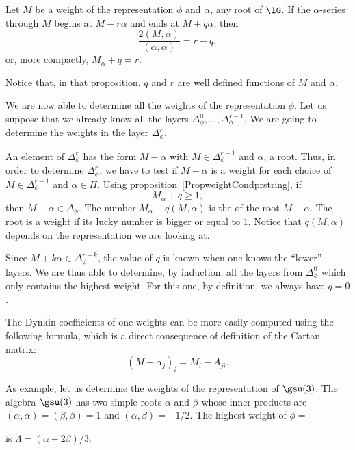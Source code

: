 \begin{proposition}     \label{PropweightCondprstring}
	Let $M$ be a weight of the representation $\phi$ and $\alpha$, any root of $\lG$. If the $\alpha$-series through $M$ begins at $M-r\alpha$ and ends at $M+q\alpha$, then
	\begin{equation}
		\frac{ 2(M,\alpha) }{ (\alpha,\alpha) }=r-q,
	\end{equation}
	or, more compactly, $M_{\alpha}+q=r$.
\end{proposition}
Notice that, in that proposition, $q$ and $r$ are well defined functions of $M$ and $\alpha$.

We are now able to determine all the weights of the representation $\phi$. Let us suppose that we already know all the layers $\Delta_{\phi}^0,\ldots,\Delta_{\phi}^{r-1}$. We are going to determine the weights in the layer $\Delta_{\phi}^r$.

An element of $\Delta_{\phi}^r$ has the form $M-\alpha$ with $M\in\Delta_{\phi}^{r-1}$ and $\alpha$, a root. Thus, in order to determine $\Delta_{\phi}^r$, we have to test if $M-\alpha$ is a weight for each choice of $M\in\Delta_{\phi}^{r-1}$ and $\alpha\in\Pi$. Using proposition~\ref{PropweightCondprstring}, if
\begin{equation}
	M_{\alpha}+q \geq 1,
\end{equation}
then $M-\alpha\in\Delta_{\phi}$. The number $M_{\alpha}-q(M,\alpha)$ is the  of the root $M-\alpha$. The root is a weight if its lucky number is bigger or equal to $1$. Notice that $q(M,\alpha)$ depends on the representation we are looking at.

Since $M+k\alpha\in\Delta_{\phi}^{r-k}$, the value of $q$ is known when one knows the ``lower'' layers. We are thus able to determine, by induction, all the layers from $\Delta^0_{\phi}$ which only contains the highest weight. For this one, by definition, we always have $q=0$.

The Dynkin coefficients of one weights can be more easily computed using the following formula, which is a direct consequence of definition of the Cartan matrix:
\begin{equation}        \label{EqCoefDynkMalpha}
	(M-\alpha_j)_i=M_i-A_{ji}.
\end{equation}

As example, let us determine the weights of the representation  of \( \gsu(3)\).
%
The algebra $\gsu(3)$ has two simple roots $\alpha$ and $\beta$ whose inner products are $(\alpha,\alpha)=(\beta,\beta)=1$ and $(\alpha,\beta)=-1/2$. The highest weight of $\phi=$

is $\Lambda=(\alpha+2\beta)/3$.

